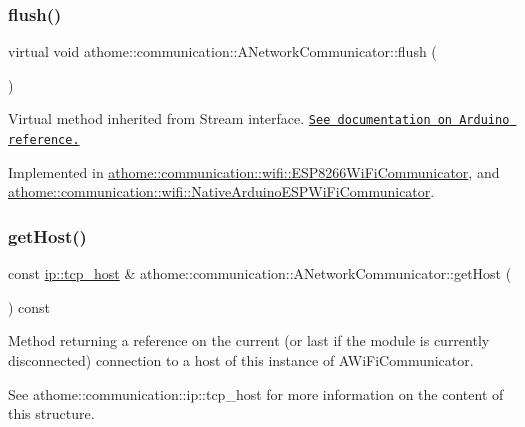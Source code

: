 \subsubsection{\texorpdfstring{flush()}{flush()}}
{\footnotesize\ttfamily virtual void athome\+::communication\+::\+A\+Network\+Communicator\+::flush (\begin{DoxyParamCaption}{ }\end{DoxyParamCaption})\hspace{0.3cm}{\ttfamily [pure virtual]}}

Virtual method inherited from Stream interface. \href{https://www.arduino.cc/reference/en/language/functions/communication/stream/streamflush/}{\tt See documentation on Arduino reference.} 

Implemented in \mbox{\hyperlink{classathome_1_1communication_1_1wifi_1_1_e_s_p8266_wi_fi_communicator_af95ca7f47285b13fc895e0d9323ee320}{athome\+::communication\+::wifi\+::\+E\+S\+P8266\+Wi\+Fi\+Communicator}}, and \mbox{\hyperlink{classathome_1_1communication_1_1wifi_1_1_native_arduino_e_s_p_wi_fi_communicator_a5b02865d3bf418d1b4dff8a1198c8dac}{athome\+::communication\+::wifi\+::\+Native\+Arduino\+E\+S\+P\+Wi\+Fi\+Communicator}}.

\mbox{\label{classathome_1_1communication_1_1_a_network_communicator_a6b52a87191bef07e73ec1bbba0713080}} 
\subsubsection{\texorpdfstring{get\+Host()}{getHost()}}
{\footnotesize\ttfamily const \mbox{\hyperlink{structathome_1_1communication_1_1ip_1_1s__host}{ip\+::tcp\+\_\+host}} \& athome\+::communication\+::\+A\+Network\+Communicator\+::get\+Host (\begin{DoxyParamCaption}{ }\end{DoxyParamCaption}) const}

Method returning a reference on the current (or last if the module is currently disconnected) connection to a host of this instance of A\+Wi\+Fi\+Communicator.

See athome\+::communication\+::ip\+::tcp\+\_\+host for more information on the content of this structure.

